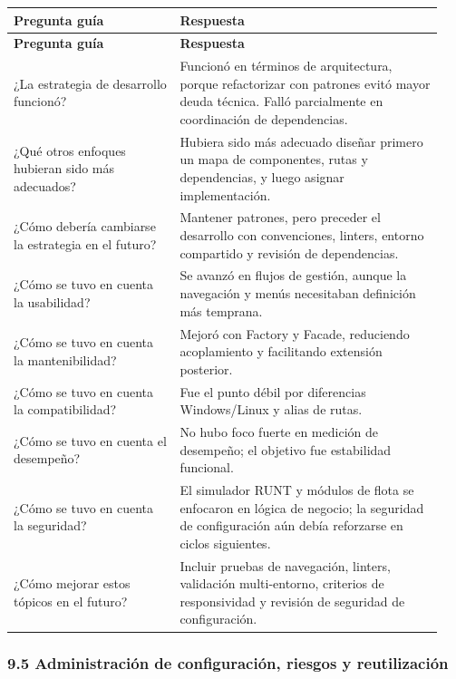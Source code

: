 \documentclass[11pt,a4paper]{article}
\begin{document}
\begingroup
\small
\setlength{\tabcolsep}{3pt}
\begin{longtable}{P{0.36\linewidth}P{0.58\linewidth}}
\toprule
\textbf{Pregunta guía} & \textbf{Respuesta} \\
\midrule
\endfirsthead
\toprule
\textbf{Pregunta guía} & \textbf{Respuesta} \\
\midrule
\endhead
\bottomrule
\endlastfoot
¿La estrategia de desarrollo funcionó? & Funcionó en términos de arquitectura, porque refactorizar con patrones evitó mayor deuda técnica. Falló parcialmente en coordinación de dependencias. \\
¿Qué otros enfoques hubieran sido más adecuados? & Hubiera sido más adecuado diseñar primero un mapa de componentes, rutas y dependencias, y luego asignar implementación. \\
¿Cómo debería cambiarse la estrategia en el futuro? & Mantener patrones, pero preceder el desarrollo con convenciones, linters, entorno compartido y revisión de dependencias. \\
¿Cómo se tuvo en cuenta la usabilidad? & Se avanzó en flujos de gestión, aunque la navegación y menús necesitaban definición más temprana. \\
¿Cómo se tuvo en cuenta la mantenibilidad? & Mejoró con Factory y Facade, reduciendo acoplamiento y facilitando extensión posterior. \\
¿Cómo se tuvo en cuenta la compatibilidad? & Fue el punto débil por diferencias Windows/Linux y alias de rutas. \\
¿Cómo se tuvo en cuenta el desempeño? & No hubo foco fuerte en medición de desempeño; el objetivo fue estabilidad funcional. \\
¿Cómo se tuvo en cuenta la seguridad? & El simulador RUNT y módulos de flota se enfocaron en lógica de negocio; la seguridad de configuración aún debía reforzarse en ciclos siguientes. \\
¿Cómo mejorar estos tópicos en el futuro? & Incluir pruebas de navegación, linters, validación multi-entorno, criterios de responsividad y revisión de seguridad de configuración. \\
\end{longtable}
\endgroup

\subsubsection{9.5 Administración de configuración, riesgos y reutilización}
\end{document}
